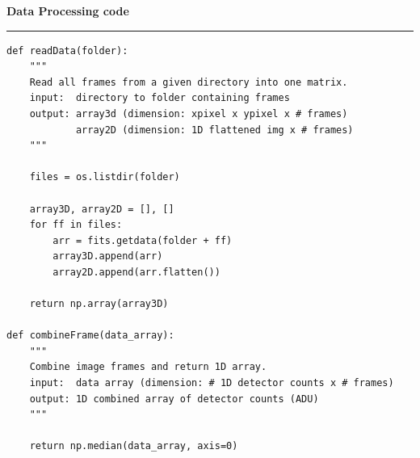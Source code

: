 \documentclass[preprint]{aastex62}
\begin{document}
\textbf{Data Processing code} \label{code:data} \\
\hrule
\begin{lstlisting}
def readData(folder):
    """
    Read all frames from a given directory into one matrix.
    input:  directory to folder containing frames
    output: array3d (dimension: xpixel x ypixel x # frames)
            array2D (dimension: 1D flattened img x # frames)
    """
    
    files = os.listdir(folder)

    array3D, array2D = [], []
    for ff in files:
        arr = fits.getdata(folder + ff)
        array3D.append(arr)
        array2D.append(arr.flatten())
    
    return np.array(array3D)

def combineFrame(data_array):
    """
    Combine image frames and return 1D array.
    input:  data array (dimension: # 1D detector counts x # frames)
    output: 1D combined array of detector counts (ADU)
    """
    
    return np.median(data_array, axis=0)
\end{lstlisting}
\end{document}
